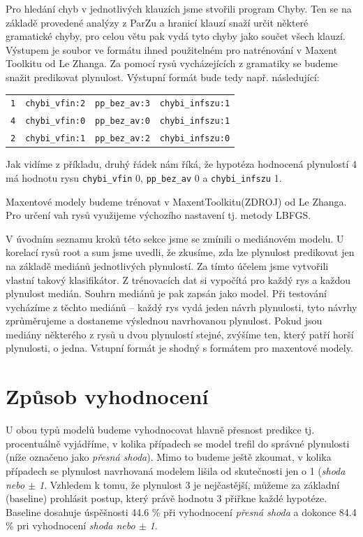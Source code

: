 \documentclass[12pt,a4paper]{report}
\begin{document}
Pro hledání chyb v jednotlivých klauzích jsme stvořili program Chyby. Ten se na základě provedené analýzy z ParZu a hranicí klauzí snaží určit některé gramatické chyby, pro celou větu pak vydá tyto chyby jako součet všech klauzí. Výstupem je soubor ve formátu ihned použitelném pro natrénování v Maxent Toolkitu od Le Zhanga. Za pomocí rysů vycházejících z gramatiky se budeme snažit predikovat plynulost. Výstupní formát bude tedy např. následující:

\begin{center}
\begin{tabular}{llll}
\hline
\texttt{1} & \texttt{chybi\_vfin:2} & \texttt{pp\_bez\_av:3} & \texttt{chybi\_infszu:1} \\
\texttt{4} & \texttt{chybi\_vfin:0} & \texttt{pp\_bez\_av:0} & \texttt{chybi\_infszu:1} \\
\texttt{2} & \texttt{chybi\_vfin:1} & \texttt{pp\_bez\_av:2} & \texttt{chybi\_infszu:0} \\
\hline
\end{tabular}
\end{center}

Jak vidíme z příkladu, druhý řádek nám říká, že hypotéza hodnocená plynulostí 4 má hodnotu rysu \texttt{chybi\_vfin} 0, \texttt{pp\_bez\_av} 0 a \texttt{chybi\_infszu} 1.

Maxentové modely budeme trénovat v MaxentToolkitu(ZDROJ) od Le Zhanga. Pro určení vah rysů využijeme výchozího nastavení tj. metody LBFGS.

V úvodním seznamu kroků této sekce jsme se zmínili o mediánovém modelu. U korelací rysů root a sum jsme uvedli, že zkusíme, zda lze plynulost predikovat jen na základě mediánů jednotlivých plynulostí. Za tímto účelem jsme vytvořili vlastní takový klasifikátor. Z trénovacích dat si vypočítá pro každý rys a každou plynulost medián. Souhrn mediánů je pak zapsán jako model. Při testování vycházíme z těchto mediánů -- každý rys vydá jeden návrh plynulosti, tyto návrhy zprůměrujeme a dostaneme výslednou navrhovanou plynulost. Pokud jsou mediány některého z rysů u dvou plynulostí stejné, zvýšíme ten, který patří horší plynulosti, o jedna. Vstupní formát je shodný s formátem pro maxentové modely.

\section{Způsob vyhodnocení}
U obou typů modelů budeme vyhodnocovat hlavně přesnost predikce tj. procentuálně vyjádříme, v kolika případech se model trefil do správné plynulosti (níže označeno jako \textit{přesná shoda}). Mimo to budeme ještě zkoumat, v kolika případech se plynulost navrhovaná modelem lišila od skutečnosti jen o 1 (\textit{shoda nebo $\pm$ 1}. Vzhledem k tomu, že plynulost 3 je nejčastější, můžeme za základní (baseline) prohlásit postup, který právě hodnotu 3 přiřkne každé hypotéze. Baseline dosahuje úspěšnosti 44.6 \% při vyhodnocení \textit{přesná shoda} a dokonce 84.4 \% pri vyhodnocení \textit{shoda nebo $\pm$ 1}.
\end{document}
